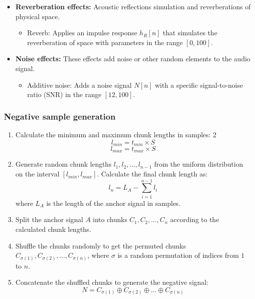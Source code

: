 \begin{itemize}
\item \textbf{Reverberation effects:} Acoustic reflections simulation and reverberations of physical space.
\begin{itemize}
    \item Reverb: Applies an impulse response $h_R[n]$ that simulates the reverberation of space with parameters in the range $[0, 100]$.
\end{itemize}

\item \textbf{Noise effects:} These effects add noise or other random elements to the audio signal.
\begin{itemize}
    \item Additive noise: Adds a noise signal $N[n]$ with a specific signal-to-noise ratio (SNR) in the range $[12, 100]$.
\end{itemize}
\end{itemize}

\subsubsection{Negative sample generation}

\begin{enumerate}
\item Calculate the minimum and maximum chunk lengths in samples:
2\begin{equation}
l_{min} = t_{min} \times S
\end{equation}
\begin{equation}
l_{max} = t_{max} \times S
\end{equation}
\item Generate random chunk lengths $l_1, l_2, \ldots, l_{n-1}$ from the uniform distribution on the interval $[l_{min}, l_{max}]$. Calculate the final chunk length as:
\begin{equation}
l_n = L_A - \sum_{i=1}^{n-1} l_i
\end{equation}
where $L_A$ is the length of the anchor signal in samples.
\item Split the anchor signal $A$ into chunks $C_1, C_2, \ldots, C_n$ according to the calculated chunk lengths.
\item Shuffle the chunks randomly to get the permuted chunks $C_{\sigma(1)}, C_{\sigma(2)}, \ldots, C_{\sigma(n)}$, where $\sigma$ is a random permutation of indices from $1$ to $n$.
\item Concatenate the shuffled chunks to generate the negative signal:
\begin{equation}\label{eq:negative_signal}
N = C_{\sigma(1)} \oplus C_{\sigma(2)} \oplus \ldots \oplus C_{\sigma(n)}
\end{equation}
\end{enumerate}

